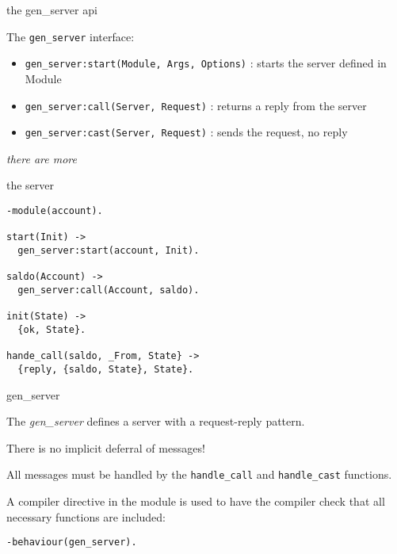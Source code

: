 \begin{frame}{the gen\_server api}

The {\tt gen\_server} interface:

\pause\vspace{20pt}

\begin{itemize}
\item {\tt gen\_server:start(Module, Args, Options)} : starts the server defined in Module
\pause
\item {\tt gen\_server:call(Server, Request)} : returns a reply from the server
\pause
\item {\tt gen\_server:cast(Server, Request)} : sends the request, no reply
\end{itemize}

\pause\vspace{20pt}
{\em there are more}

\end{frame}



\begin{frame}[fragile]{the server}
\begin{verbatim}
-module(account).

start(Init) ->
  gen_server:start(account, Init).

saldo(Account) ->
  gen_server:call(Account, saldo).

init(State) ->
  {ok, State}.

hande_call(saldo, _From, State} ->
  {reply, {saldo, State}, State}.

\end{verbatim}

\end{frame}

\begin{frame}[fragile]{gen\_server}

The {\em gen\_server} defines a server with a request-reply pattern. 

\pause\vspace{20pt}
There is no implicit deferral of messages!

\pause\vspace{20pt}
All messages must be handled by the {\tt handle\_call} and {\tt handle\_cast} functions.

\pause\vspace{20pt}
A compiler directive in the module is used to have the compiler check that all necessary functions are included:

\begin{verbatim}
-behaviour(gen_server).
\end{verbatim}

\end{frame}



